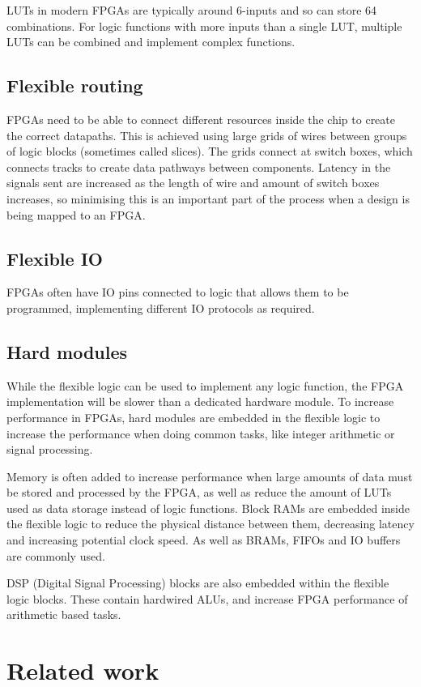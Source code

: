 LUTs in modern FPGAs are typically around 6-inputs and so can store 64 combinations. For logic functions with more inputs than a single LUT, multiple LUTs can be combined and implement complex functions.

\subsection{Flexible routing}
FPGAs need to be able to connect different resources inside the chip to create the correct datapaths. This is achieved using large grids of wires between groups of logic blocks (sometimes called slices). The grids connect at switch boxes, which connects tracks to create data pathways between components. Latency in the signals sent are increased as the length of wire and amount of switch boxes increases, so minimising this is an important part of the process when a design is being mapped to an FPGA.

\subsection{Flexible IO}
FPGAs often have IO pins connected to logic that allows them to be programmed, implementing different IO protocols as required.

\subsection{Hard modules}
While the flexible logic can be used to implement any logic function, the FPGA implementation will be slower than a dedicated hardware module. To increase performance in FPGAs, hard modules are embedded in the flexible logic to increase the performance when doing common tasks, like integer arithmetic or signal processing. 

Memory is often added to increase performance when large amounts of data must be stored and processed by the FPGA, as well as reduce the amount of LUTs used as data storage instead of logic functions. Block RAMs are embedded inside the flexible logic to reduce the physical distance between them, decreasing latency and increasing potential clock speed. As well as BRAMs, FIFOs and IO buffers are commonly used.

DSP (Digital Signal Processing) blocks are also embedded within the flexible logic blocks. These contain hardwired ALUs, and increase FPGA performance of arithmetic based tasks.

\section{Related work}
